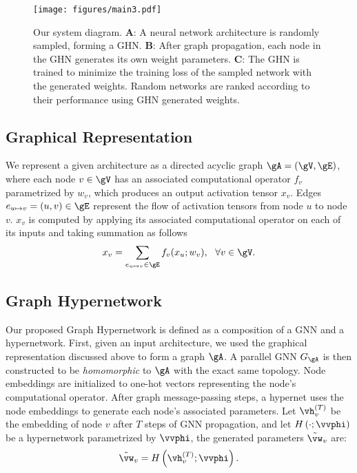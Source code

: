 \documentclass{article} %
\begin{document}
\begin{figure}
\vspace{-0.9cm}
\texttt{[image: figures/main3.pdf]}
\vspace{-1cm}
\caption{Our system diagram. \textbf{A}: A neural network architecture
is randomly sampled, forming a GHN. \textbf{B}: After graph propagation, each node in the GHN
generates its own weight parameters. \textbf{C}: The GHN is trained to minimize the training loss of
the sampled network with the generated weights. Random networks are ranked according to their
performance using GHN generated weights. }
\label{fig:main}
\vspace{-0.3cm}
\end{figure}\subsection{Graphical Representation}
We represent a given architecture as a directed acyclic graph $\gA = (\gV, \gE)$, where each node $v
\in \gV$  has an associated computational operator $f_v$ parametrized by $w_v$, which produces an
output activation tensor $x_v$. Edges $e_{u \mapsto v} = (u, v) \in \gE$ represent the flow of
activation tensors from node $u$ to node $v$. $x_v$ is computed by applying its associated
computational operator on each of its inputs and taking summation as follows
\begin{equation}
\label{eq:compute_node}
x_v = \sum_{e_{u \mapsto v} \in \gE} f_v(x_u; w_v), \ \ \forall v \in \gV.
\end{equation}\subsection{Graph Hypernetwork}
Our proposed Graph Hypernetwork is defined as a composition of a GNN and a hypernetwork. First,
given an input architecture, we used the graphical representation discussed above to form a graph
$\gA$. A parallel GNN $G_\gA$ is then constructed to be \textit{homomorphic} to $\gA$ with the exact
same topology. Node embeddings are initialized to one-hot vectors representing the node's
computational operator. After graph message-passing steps, a hypernet uses the node embeddings to
generate each node's associated parameters. Let $\vh_v^{(T)}$ be the embedding of node $v$ after $T$
steps of GNN propagation, and let $H \left(\cdot; \vvphi\right)$ be a hypernetwork parametrized by
$\vvphi$, the generated parameters $\tilde{\vw}_v$ are:
\begin{equation}
\tilde{\vw}_v = H \left(\vh_v^{(T)}; \vvphi\right).
\end{equation}
\end{document}
